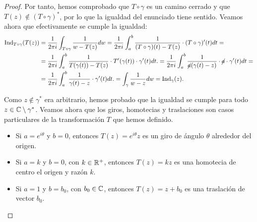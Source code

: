 \begin{ejercicio}
\begin{proof}
        Por tanto, hemos comprobado que $T\circ\gamma$ es un camino cerrado y que $T(z) \notin (T\circ\gamma)^*$, por lo que la igualdad del enunciado tiene sentido. Veamos ahora que efectivamente se cumple la igualdad:
        \begin{align*}
            \operatorname{Ind}_{T\circ\gamma}(T(z)) &= \frac{1}{2\pi i} \int_{T\circ\gamma} \frac{1}{w - T(z)} dw
            = \frac{1}{2\pi i} \int_{a}^{b} \frac{1}{(T\circ \gamma)(t) - T(z)} \cdot (T\circ \gamma)'(t) dt
            =\\&= \frac{1}{2\pi i} \int_{a}^{b} \frac{1}{T(\gamma(t)) - T(z)} \cdot T'(\gamma(t)) \cdot \gamma'(t) dt.
            = \frac{1}{2\pi i} \int_{a}^{b} \frac{1}{\cancel{a}(\gamma(t)-z)} \cdot \cancel{a} \cdot \gamma'(t) dt
            =\\&= \frac{1}{2\pi i} \int_{a}^{b} \frac{1}{\gamma(t)-z} \cdot \gamma'(t) dt.
            = \int_{\gamma} \frac{1}{w - z} dw
            = \operatorname{Ind}_{\gamma}(z).
        \end{align*}

        Como $z \notin \gamma^*$ era arbitrario, hemos probado que la igualdad se cumple para todo $z \in \mathbb{C} \setminus \gamma^*$. Veamos ahora que los giros, homotecias y traslaciones son casos particulares de la transformación $T$ que hemos definido.
        \begin{itemize}
            \item Si $a = e^{i\theta}$ y $b = 0$, entonces $T(z) = e^{i\theta}z$ es un giro de ángulo $\theta$ alrededor del origen.
            \item Si $a = k$ y $b = 0$, con $k\in \mathbb{R}^+$, entonces $T(z) = kz$ es una homotecia de centro el origen y razón $k$.
            \item Si $a = 1$ y $b = b_0$, con $b_0 \in \mathbb{C}$, entonces $T(z) = z + b_0$ es una traslación de vector $b_0$.
        \end{itemize}
    \end{proof}
\end{ejercicio}

